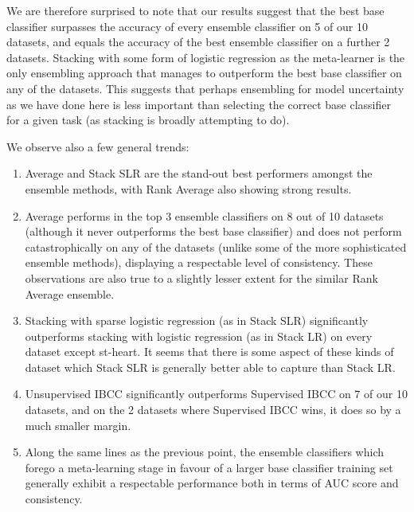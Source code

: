 \documentclass{bioinfo}
\begin{document}
We are therefore surprised to note that our results suggest that the best base classifier surpasses the accuracy of every ensemble classifier on 5 of our 10 datasets, and equals the accuracy of the best ensemble classifier on a further 2 datasets. Stacking with some form of logistic regression as the meta-learner is the only ensembling approach that manages to outperform the best base classifier on any of the datasets. This suggests that perhaps ensembling for model uncertainty as we have done here is less important than selecting the correct base classifier for a given task (as stacking is broadly attempting to do).

\noindent
We observe also a few general trends:

\begin{enumerate}
\item Average and Stack SLR are the stand-out best performers amongst the ensemble methods, with Rank Average also showing strong results.
\item Average performs in the top 3 ensemble classifiers on 8 out of 10 datasets (although it never outperforms the best base classifier) and does not perform catastrophically on any of the datasets (unlike some of the more sophisticated ensemble methods), displaying a respectable level of consistency. These observations are also true to a slightly lesser extent for the similar Rank Average ensemble.
\item Stacking with sparse logistic regression (as in Stack SLR) significantly outperforms stacking with logistic regression (as in Stack LR) on every dataset except st-heart. It seems that there is some aspect of these kinds of dataset which Stack SLR is generally better able to capture than Stack LR.
\item Unsupervised IBCC significantly outperforms Supervised IBCC on 7 of our 10 datasets, and on the 2 datasets where Supervised IBCC wins, it does so by a much smaller margin.
\item Along the same lines as the previous point, the ensemble classifiers which forego a meta-learning stage in favour of a larger base classifier training set generally exhibit a respectable performance both in terms of AUC score and consistency.
\end{enumerate}
\end{document}
